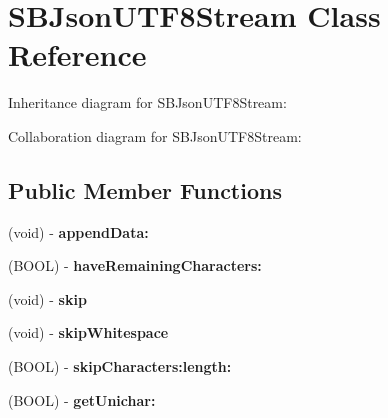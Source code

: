 \hypertarget{interface_s_b_json_u_t_f8_stream}{
\section{\-S\-B\-Json\-U\-T\-F8\-Stream \-Class \-Reference}
\label{interface_s_b_json_u_t_f8_stream}
}


\-Inheritance diagram for \-S\-B\-Json\-U\-T\-F8\-Stream\-:


\-Collaboration diagram for \-S\-B\-Json\-U\-T\-F8\-Stream\-:
\subsection*{\-Public \-Member \-Functions}
\begin{DoxyCompactItemize}
\item 
\hypertarget{interface_s_b_json_u_t_f8_stream_a64b3d20e0373bfbb5bd2dd29b1b1919f}{
(void) -\/ {\bfseries append\-Data\-:}}
\label{interface_s_b_json_u_t_f8_stream_a64b3d20e0373bfbb5bd2dd29b1b1919f}

\item 
\hypertarget{interface_s_b_json_u_t_f8_stream_acf91817d2bd973b1f8b2cb828bc9e5f2}{
(\-B\-O\-O\-L) -\/ {\bfseries have\-Remaining\-Characters\-:}}
\label{interface_s_b_json_u_t_f8_stream_acf91817d2bd973b1f8b2cb828bc9e5f2}

\item 
\hypertarget{interface_s_b_json_u_t_f8_stream_aa3bb83bf9ee2ebc7d8eed0cbcd35729f}{
(void) -\/ {\bfseries skip}}
\label{interface_s_b_json_u_t_f8_stream_aa3bb83bf9ee2ebc7d8eed0cbcd35729f}

\item 
\hypertarget{interface_s_b_json_u_t_f8_stream_a724e347ce0f65d66276e978f5e8dd2d2}{
(void) -\/ {\bfseries skip\-Whitespace}}
\label{interface_s_b_json_u_t_f8_stream_a724e347ce0f65d66276e978f5e8dd2d2}

\item 
\hypertarget{interface_s_b_json_u_t_f8_stream_acdbfede2e91d9eba153d707be4f37d27}{
(\-B\-O\-O\-L) -\/ {\bfseries skip\-Characters\-:length\-:}}
\label{interface_s_b_json_u_t_f8_stream_acdbfede2e91d9eba153d707be4f37d27}

\item 
\hypertarget{interface_s_b_json_u_t_f8_stream_a74153b4e039bcb2626a6162b8c9024c1}{
(\-B\-O\-O\-L) -\/ {\bfseries get\-Unichar\-:}}
\label{interface_s_b_json_u_t_f8_stream_a74153b4e039bcb2626a6162b8c9024c1}


\end{DoxyCompactItemize}

